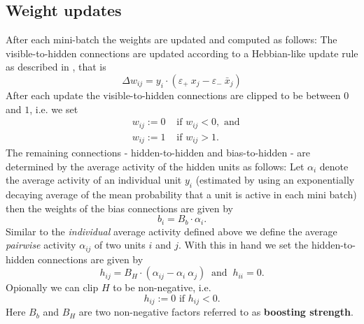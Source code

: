 \documentclass[titlepage]{amsart}
\theoremstyle{definition}
\begin{document}
\subsection{Weight updates}
% 
% 
After each mini-batch the weights are updated and computed as follows:
The visible-to-hidden connections are updated according to a Hebbian-like update rule 
as described in \cite{sp_paper}, that is
% 
\begin{equation}
\label{eqn:numenta hebbian update}
\Delta w_{ij} = y_i \cdot  ( \varepsilon_+ \ x_j - \varepsilon_- \ \bar x_j ) 
\end{equation}
% 
After each update the visible-to-hidden connections
are clipped to be between $0$ and $1$, i.e. we set
% 
\begin{eqnarray*}
   &w_{ij} := 0& \text{ if } w_{ij} < 0 , \text{ and} \\
   &w_{ij} := 1& \text{ if } w_{ij} > 1.
\end{eqnarray*}
% 
The remaining connections - hidden-to-hidden and bias-to-hidden - 
are determined by the average activity of the hidden units as follows:
Let $\alpha_i$ denote the average activity of an individual unit $y_i$
(estimated by using an exponentially decaying average of the mean probability 
that a unit is active in each mini batch) then the weights of the bias 
connections are given by
% 
\begin{equation}
\label{eqn:bias update}
  b_{i}  = B_b \cdot \alpha_i.
\end{equation}
% 
Similar to the \textit{individual} average activity defined above we define 
the average \textit{pairwise} activity $\alpha_{ij}$ of two units $i$ and $j$.
With this in hand we set the hidden-to-hidden connections are given by
% 
\begin{equation}
\label{eqn:hidden updates}
  h_{ij} = B_H \cdot ( \alpha_{ij} - \alpha_i \ \alpha_j ) \ \text{ and } \  h_{ii} = 0.
\end{equation}
% 
Opionally we can clip $H$ to be non-negative, i.e.
$$
  h_{ij} := 0 \text{ if } h_{ij} < 0.
$$
Here $B_b$ and $B_H$ are two non-negative factors referred to as \textbf{boosting strength}.
% 
% 
\end{document}
